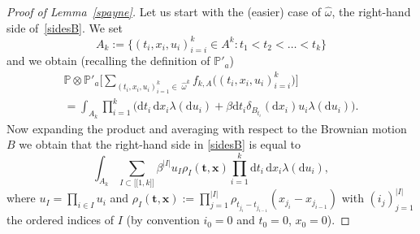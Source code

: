 \documentclass[JEP,XML,SOM,Unicode,published]{cedram}
\let\sep:
\newcommand{\lint}{\mathopen{[\![}}
\newcommand{\rint}{\mathclose{]\!]}}
\theoremstyle{definition}
\newcommand{\bt}{\boldsymbol{t}}
\newcommand{\bx}{\boldsymbol{x}}
\newcommand{\dd}{\mathrm{d}}
\newcommand{\bbP}{{\ensuremath{\mathbb P}} }
\let\go\omega
\begin{document}
\begin{proof}[Proof of Lemma~\ref{spayne}]
Let us start with the (easier) case of $\hat \go$, \ie the right-hand side of~\eqref{sidesB}.
We set
\[
A_k:= \bigl\{ (t_i,x_i,u_i)_{i=i}^k\in A^k \sep t_1<t_2<\dots<t_k \bigr\}
\]
and we obtain (recalling the definition of $\bbP'_a$)\vspace*{-5pt}
\begin{multline*}
\bbP\otimes \bbP'_a \bigg[ \sum_{(t_i,x_i,u_i)_{i=1}^k\in \; \hat \go^k} f_{k,A} \bigl((t_i,x_i,u_i)_{i=i}^k \bigr) \bigg]\\[-8pt]
= \int_{A_k} \prod_{i=1}^k\bigl(\dd t_i\,\dd x_i \lambda (\dd u_i) + \beta \dd t_i \delta_{B_{t_i}}(\dd x_i) u_i \lambda (\dd u_i) \bigr).
\end{multline*}
Now expanding the product and averaging with respect to the Brownian motion~$B$ we obtain that the
right-hand side in \eqref{sidesB} is equal to
\begin{equation}
\label{rhsofsides}
\int_{A_k} \sum_{I\subset\lint 1,k\rint}\beta^{|I|} u_I \rho_I(\bt,\bx) \prod_{i=1}^k \dd t_i\,\dd x_i \lambda (\dd u_i),
\end{equation}
where $u_I=\prod_{i\in I} u_i$ and $\rho_I(\bt, \bx):= \prod_{j=1}^{|I|} \rho_{t_{j_{i}}- t_{j_{i-1}}}(x_{j_{i}}-x_{j_{i-1}})$ with
$(i_j)_{j=1}^{|I|}$ the ordered indices of $I$ (by convention $i_0=0$ and $t_0=0$, $x_0=0$).


\end{proof}
\end{document}
